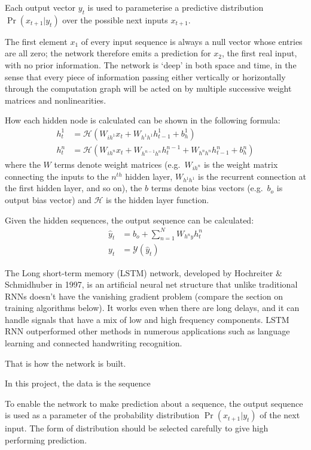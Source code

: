 \documentclass{article} %
\begin{document}
Each output vector $y_t$ is used to parameterise a predictive distribution $\Pr(x_{t+1}|y_t)$ over the possible next inputs $x_{t+1}$.

The first element $x_1$ of every input sequence is always a null vector whose entries are all zero; the network therefore emits a prediction for $x_2$, the first real input, with no prior information.
The network is `deep' in both space and time, in the sense that every piece of information passing either vertically or horizontally through the computation graph will be acted on by multiple successive weight matrices and nonlinearities.

How each hidden node is calculated can be shown in the following formula: 
\begin{align}
\label{eq:pred_hidden}
h^1_t &= \mathcal{H}\left(W_{i h^1} x_t + W_{h^{1}h^{1}} h^1_{t-1} + b_{h}^1 \right)\\
h^n_t &= \mathcal{H}\left(W_{i h^n} x_t + W_{h^{n-1}h^{n}} h^{n-1}_t + W_{h^{n}h^{n}} h^n_{t-1} + b_h^n \right)
\end{align} 
where the $W$ terms denote weight matrices (e.g.\ $W_{i h^n}$ is the weight matrix connecting the inputs to the $n^{th}$ hidden layer, $W_{h^{1}h^{1}}$ is the recurrent connection at the first hidden layer, and so on), the $b$ terms denote bias vectors (e.g.\ $b_o$ is output bias vector) and $\mathcal{H}$ is the hidden layer function. 

Given the hidden sequences, the output sequence can be calculated: 
\begin{align}
\label{eq:pred_output}
\hat{y}_t &= b_o + \sum_{n=1}^N{W_{h^n y} h^n_t}\\
y_t &= \mathcal{Y}(\hat{y}_t)	
\end{align}

The Long short-term memory (LSTM) network, developed by Hochreiter \& Schmidhuber in 1997, is an artificial neural net structure that unlike traditional RNNs doesn't have the vanishing gradient problem (compare the section on training algorithms below). It works even when there are long delays, and it can handle signals that have a mix of low and high frequency components. LSTM RNN outperformed other methods in numerous applications such as language learning and connected handwriting recognition.


That is how the network is built. 

In this project, the data is the sequence 

To enable the network to make prediction about a sequence, the output sequence is used as a parameter of the probability distribution $\Pr(x_{t+1}|y_t)$ of the next input. The form of distribution should be selected carefully to give high performing prediction. 
\end{document}
